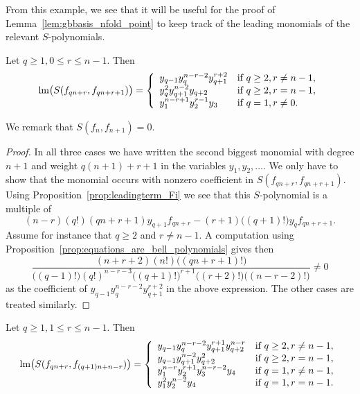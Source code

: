 From this example, we see that it will be useful for the proof of Lemma~\ref{lem:gbbasis_nfold_point} to keep track of the leading monomials of the relevant $S$-polynomials.

\begin{Prop}\label{prop:lm_S_poly_consecutive}
Let $q\geq 1, 0\leq r\leq n-1$. Then
\[ \textnormal{lm}\bigl(S(f_{qn+r} , f_{qn+r+1})\bigr) = \left\{\begin{array}{ll} y_{q-1}y_q^{n-r-2}y_{q+1}^{r+2} & \text{if } q\geq 2, r\neq n-1, \\
y_q^2y_{q+1}^{n-2}y_{q+2} & \text{if } q\geq 2, r = n-1, \\
y_1^{n-r+1}y_2^{r-1}y_3 & \text{if } q=1, r\neq 0.
 \end{array}\right. \]
\end{Prop}

We remark that $S(f_n,f_{n+1})= 0$.

\begin{proof}
In all three cases we have written the second biggest monomial with degree $n+1$ and weight $q(n+1)+r+1$ in the variables $y_1,y_2,\ldots$. We only have to show that the monomial occurs with nonzero coefficient in $S(f_{qn+r} , f_{qn+r+1})$. Using Proposition~\ref{prop:leadingterm_Fi} we see that this $S$-polynomial is a multiple of
\[   (n-r)(q!)(qn+r+1)y_{q+1}f_{qn+r} -(r+1)\bigl((q+1)!\bigr) y_q f_{qn+r+1}. \]
Assume for instance that $q\geq 2$ and $r\neq n-1$. A computation using Proposition~\ref{prop:equations_are_bell_polynomials} gives then 
\[ \frac{(n+r+2)(n!)\bigl( (qn+r+1)!\bigr)}{\bigl((q-1)!\bigr)(q!)^{n-r-3}\bigl((q+1)!\bigr)^{r+1}\bigl((r+2)!\bigr)\bigl((n-r-2)!\bigr)} \neq 0  \]
as the coefficient of $y_{q-1}y_q^{n-r-2}y_{q+1}^{r+2}$ in the above expression. The other cases are treated similarly.
\end{proof}


\begin{Prop}\label{prop:lm_S_poly_difficult}
Let $q\geq 1, 1\leq r\leq n-1$. Then
\[ \textnormal{lm}\bigl(S(f_{qn+r} , f_{(q+1)n+n-r})\bigr) = \left\{\begin{array}{ll} y_{q-1}y_q^{n-r-2}y_{q+1}^{r+1}y_{q+2}^{n-r} & \text{if } q\geq 2, r\neq n-1, \\
y_{q-1}y_{q+1}^{n-2}y_{q+2}^2 & \text{if } q\geq 2, r = n-1, \\
y_1^{n-r}y_2^{r+1}y_3^{n-r-2}y_4 & \text{if } q=1, r\neq n-1, \\
y_1^{2}y_2^{n-2}y_4 & \text{if } q=1, r=n-1.
 \end{array}\right. \]
\end{Prop}

